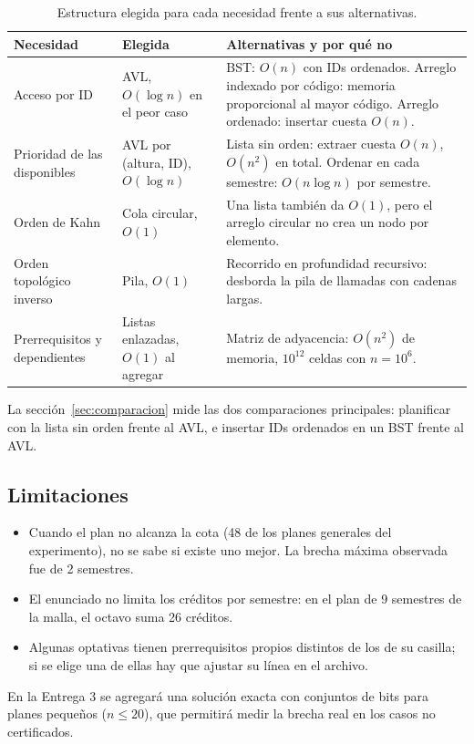 \documentclass[11pt,letterpaper]{article}
\newcommand{\num}[1]{\pgfmathprintnumber[int detect]{#1}}
\begin{document}
\begin{table}[H]
\centering
\small
\caption{Estructura elegida para cada necesidad frente a sus alternativas.}
\label{tab:alternativas}
\begin{tabularx}{\linewidth}{@{}P{2.6cm} P{3.1cm} L@{}}
\toprule
\textbf{Necesidad} & \textbf{Elegida} & \textbf{Alternativas y por qué no} \\
\midrule
Acceso por ID & AVL, $O(\log n)$ en el peor caso & BST: $O(n)$ con IDs ordenados. Arreglo indexado por código: memoria proporcional al mayor código. Arreglo ordenado: insertar cuesta $O(n)$. \\
Prioridad de las disponibles & AVL por (altura, ID), $O(\log n)$ & Lista sin orden: extraer cuesta $O(n)$, $O(n^2)$ en total. Ordenar en cada semestre: $O(n \log n)$ por semestre. \\
Orden de Kahn & Cola circular, $O(1)$ & Una lista también da $O(1)$, pero el arreglo circular no crea un nodo por elemento. \\
Orden topológico inverso & Pila, $O(1)$ & Recorrido en profundidad recursivo: desborda la pila de llamadas con cadenas largas. \\
Prerrequisitos y dependientes & Listas enlazadas, $O(1)$ al agregar & Matriz de adyacencia: $O(n^2)$ de memoria, $10^{12}$ celdas con $n = 10^6$. \\
\bottomrule
\end{tabularx}
\end{table}

La sección~\ref{sec:comparacion} mide las dos comparaciones principales: planificar con la lista sin orden frente al AVL, e insertar IDs ordenados en un BST frente al AVL.

\subsection{Limitaciones}
\begin{itemize}
\item Cuando el plan no alcanza la cota (48 de los \num{6000} planes generales del experimento), no se sabe si existe uno mejor. La brecha máxima observada fue de 2 semestres.
\item El enunciado no limita los créditos por semestre: en el plan de 9 semestres de la malla, el octavo suma 26 créditos.
\item Algunas optativas tienen prerrequisitos propios distintos de los de su casilla; si se elige una de ellas hay que ajustar su línea en el archivo.
\end{itemize}
En la Entrega 3 se agregará una solución exacta con conjuntos de bits para planes pequeños ($n \leq 20$), que permitirá medir la brecha real en los casos no certificados.
\end{document}
